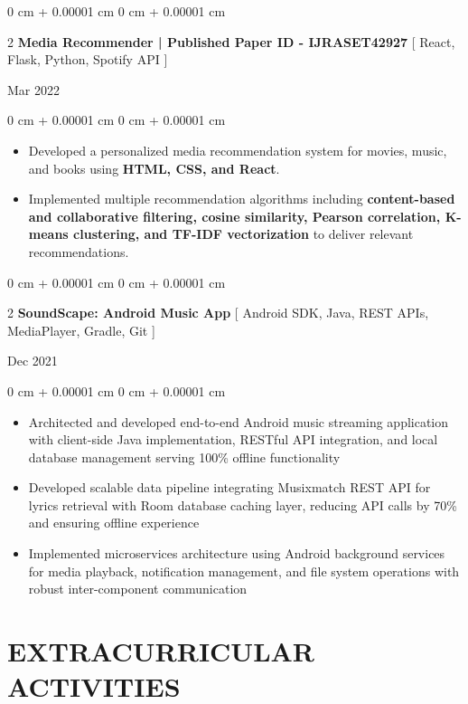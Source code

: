 \documentclass[9pt, letterpaper]{article}
\newenvironment{highlights}{
    \begin{itemize}[
        topsep=0.05 cm,
        parsep=0 pt,
        partopsep=0pt,
        itemsep=0pt,
        leftmargin=10pt
    ]
}{
    \end{itemize}
} %
\newenvironment{onecolentry}{
    \begin{adjustwidth}{
        0 cm + 0.00001 cm}{
        0 cm + 0.00001 cm}
}{
    \end{adjustwidth}
} %
\newenvironment{twocolentry}[2][]{
    \onecolentry
    \def\secondColumn{#2}
    \setcolumnwidth{\fill, 4.5 cm}
    \begin{paracol}{2}
}{
    \switchcolumn \raggedleft \secondColumn
    \end{paracol}
    \endonecolentry
} %
\begin{document}
    \begin{twocolentry}
        {Mar 2022}\textbf{Media Recommender | Published Paper ID - IJRASET42927} [ React, Flask, Python, Spotify API ]
    \end{twocolentry}
    \begin{onecolentry}
        \begin{highlights}
            \item Developed a personalized media recommendation system for movies, music, and books using \textbf{HTML, CSS, and React}.
            \item Implemented multiple recommendation algorithms including \textbf{content-based and collaborative filtering, cosine similarity, Pearson correlation, K-means clustering, and TF-IDF vectorization} to deliver relevant recommendations.
        \end{highlights}
    \end{onecolentry}


    \begin{twocolentry}
        {Dec 2021}\textbf{SoundScape: Android Music App} [ Android SDK, Java, REST APIs, MediaPlayer, Gradle, Git ]
    \end{twocolentry}
    \begin{onecolentry}
        \begin{highlights}
            \item Architected and developed end-to-end Android music streaming application with client-side Java implementation, RESTful API integration, and local database management serving 100\% offline functionality
            \item Developed scalable data pipeline integrating Musixmatch REST API for lyrics retrieval with Room database caching layer, reducing API calls by 70\% and ensuring offline experience
            \item Implemented microservices architecture using Android background services for media playback, notification management, and file system operations with robust inter-component communication
        \end{highlights}
    \end{onecolentry}


% 


% 

\section{EXTRACURRICULAR ACTIVITIES}
\end{document}
